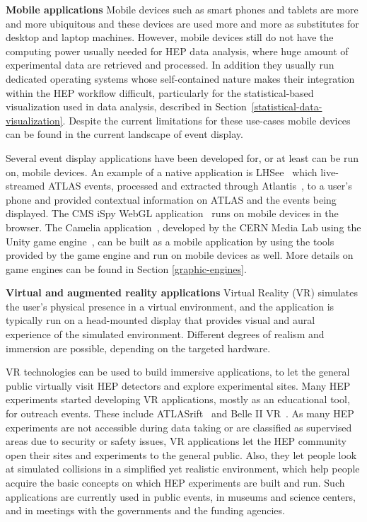 \documentclass[12pt,a4paper]{article}
\begin{document}
{\bf Mobile applications} Mobile devices such as smart phones and tablets are more and more ubiquitous and these devices
are used more and more as substitutes for desktop and laptop machines.
However, mobile devices still do not have the computing power usually needed for HEP data analysis, where huge amount of experimental data
are retrieved and processed. In addition they usually run dedicated operating systems whose self-contained nature
makes their integration within the HEP workflow difficult, particularly for the statistical-based visualization used in
data analysis, described in Section~\ref{statistical-data-visualization}. Despite the current limitations for these use-cases mobile
devices can be found in the current landscape of event display.

Several event display applications have been developed for, or at least can be run on, mobile devices.
An example of a native application is LHSee~\cite{LHSee} which live-streamed ATLAS events, processed and extracted
through Atlantis~\cite{ATLASAtlantis},
to a user’s phone and provided contextual information on ATLAS and the
events being displayed. The CMS iSpy WebGL application~\cite{CMSISpyWebGL} runs on mobile devices in the browser.
The Camelia application~\cite{CERNCamelia}, %
developed by the CERN Media Lab using the Unity game engine~\cite{Unity3D}, can be built as a mobile application
by using the tools provided by the game engine and run on mobile devices as well.
More details on game engines can be found in Section \ref{graphic-engines}.

{\bf Virtual and augmented reality applications} Virtual Reality (VR) simulates the user’s physical presence in a virtual environment,
and the application is typically run on a head-mounted display that provides visual and aural experience of the simulated environment.
Different degrees of realism and immersion are possible, depending on the targeted hardware.

VR technologies can be used to build immersive applications, to let the general public virtually visit HEP detectors and explore
experimental sites. Many HEP experiments started developing VR applications, mostly as an educational tool, for outreach events.
These include ATLASrift~\cite{ATLASRift} and Belle II VR~\cite{BelleIIVR}.
As many HEP experiments are not accessible during data taking or are classified as supervised areas due to security or safety issues,
VR applications let the HEP community open their sites and experiments to the general public. Also,
they let people look at simulated  collisions in a simplified yet realistic environment, which help people acquire the basic
concepts on which HEP experiments are built and run. Such applications are currently used in public events,
in museums and science centers, and in meetings with the governments and the funding agencies.
\end{document}
